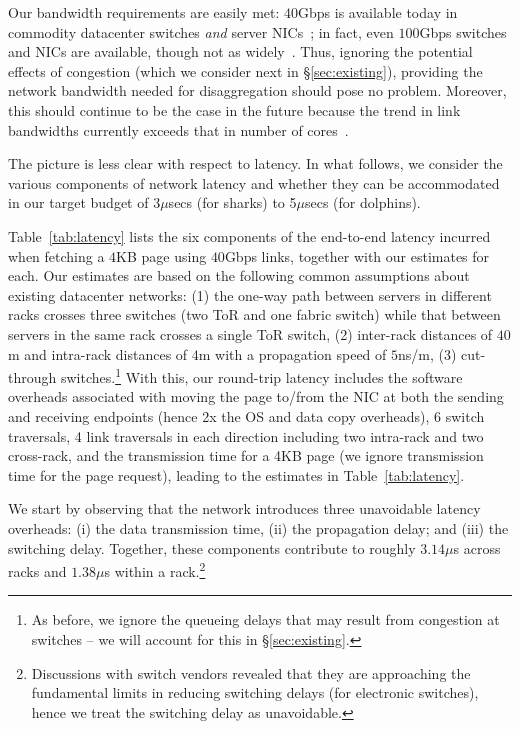  Our bandwidth requirements are easily met: $40$Gbps is available today in commodity datacenter switches \emph{and} server NICs~\cite{40gnic}; in fact, even $100$Gbps switches and NICs are available, though not as widely~\cite{100gnic}.
Thus, ignoring the potential effects of congestion (which we consider next in \S\ref{sec:existing}), providing the network bandwidth needed for disaggregation should pose no problem. Moreover, this should continue to be the case in the future because the trend in link bandwidths currently exceeds that in number of cores~\cite{hmc1, hmc2, hmc3}.



 The picture is less clear with respect to latency. In what follows, we consider the various components of network latency and whether they can be accommodated in our target budget of 3$\mu$secs (for sharks) to 5$\mu$secs (for dolphins).

Table~\ref{tab:latency} lists the six components of the end-to-end latency incurred when fetching  a $4$KB page using $40$Gbps links, together with our estimates for each. Our estimates are based on the following common assumptions about existing datacenter networks: (1) the one-way path between servers in different racks crosses three switches (two ToR and one fabric switch) while that between servers in the same rack crosses a single ToR switch, (2) inter-rack distances of $40$m and intra-rack distances of $4$m with a propagation speed of $5$ns/m, (3) cut-through switches.\footnote{As before, we ignore the queueing delays that may result from congestion at switches -- we will account for this in \S\ref{sec:existing}.}  
With this, our round-trip latency includes the software overheads associated with moving the page to/from the NIC at both the sending and receiving endpoints (hence 2x the OS and data copy overheads), 6 switch traversals, 4 link traversals in each direction including two intra-rack and two cross-rack, and the transmission time for a 4KB page (we ignore transmission time for the page request), leading to the estimates in Table~\ref{tab:latency}. 

We start by observing that the network introduces three unavoidable latency overheads: (i) the data transmission time, (ii) the propagation delay; and (iii) the switching delay. 
Together, these components contribute to roughly $3.14\mu$s across racks and $1.38\mu$s within a rack.\footnote{Discussions with switch vendors revealed that they are approaching the fundamental limits in reducing switching delays (for electronic switches), hence we treat the switching delay as unavoidable.} 

